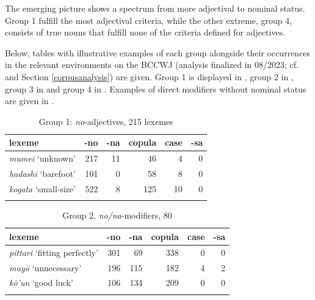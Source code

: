 The emerging picture shows a spectrum from more adjectival to nominal status. Group 1 fulfill the most adjectival criteria, while the other extreme, group 4, consists of true nouns that fulfill none of the criteria defined for adjectives.

\largerpage[2]
Below, tables with illustrative examples of each group alongside their occurrences in the relevant environments on the BCCWJ (analysis finalized in 08/2023; cf. \citealt{kohlich:2023:suppl} and Section \ref{corpusanalysis}) are given. Group 1 is displayed in , group 2 in , group 3 in  and group 4 in . Examples of direct modifiers without nominal status are given in .\clearpage

\begin{table}[p!]
\centering
\begin{tabularx}{\textwidth}{Xrrrrr}
\lsptoprule
\textbf{lexeme} & \textbf{-no} & \textbf{-na} & \textbf{copula} & \textbf{case} & \textbf{-sa} \\
\midrule
\textit{mumei} `unknown’    & 217 & 11 & 46  & 4  & 0 \\
\textit{hadashi} `barefoot’ & 101 & 0  & 58  & 8  & 0 \\
\textit{kogata} `small-size’& 522 & 8  & 125 & 10 & 0 \\
\lspbottomrule
\end{tabularx}
\caption{Group 1: \textit{no}-adjectives, 215 lexemes}
\label{table group 1}
\end{table}

\begin{table}[p!]
\centering
\begin{tabularx}{\textwidth}{Xrrrrr}
\lsptoprule
\textbf{lexeme} & \textbf{-no} & \textbf{-na} & \textbf{copula} & \textbf{case} & \textbf{-sa} \\
\midrule
\textit{pittari} `fitting perfectly’ & 301 & 69  & 338 & 0   & 0 \\
\textit{muyō} `unnecessary’          & 196 & 115 & 182 & 4   & 2 \\
\textit{kō’un} `good luck’           & 106 & 134 & 209 & 0   & 0 \\
\lspbottomrule
\end{tabularx}
\caption{Group 2, \textit{no/na}-modifiers, 80}
\label{table group 2}
\end{table}

